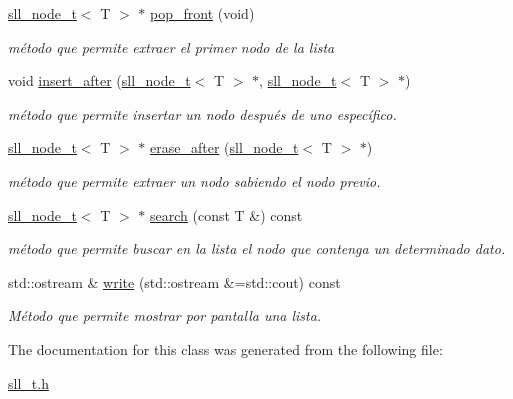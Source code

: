 \begin{DoxyCompactItemize}
\hyperlink{classsll__node__t}{sll\+\_\+node\+\_\+t}$<$ T $>$ $\ast$ \hyperlink{classsll__t_a27c36ba6bbb9b40fec134e6909ff490b}{pop\+\_\+front} (void)
\begin{DoxyCompactList}\small\item\em método que permite extraer el primer nodo de la lista \end{DoxyCompactList}\item 
\mbox{\label{classsll__t_abb114d081db42f36aaba59dc3237847f}} 
void \hyperlink{classsll__t_abb114d081db42f36aaba59dc3237847f}{insert\+\_\+after} (\hyperlink{classsll__node__t}{sll\+\_\+node\+\_\+t}$<$ T $>$ $\ast$, \hyperlink{classsll__node__t}{sll\+\_\+node\+\_\+t}$<$ T $>$ $\ast$)
\begin{DoxyCompactList}\small\item\em método que permite insertar un nodo después de uno específico. \end{DoxyCompactList}\item 
\mbox{\label{classsll__t_ad5b8b92ca0a0a4a1cb8f90ddf208b342}} 
\hyperlink{classsll__node__t}{sll\+\_\+node\+\_\+t}$<$ T $>$ $\ast$ \hyperlink{classsll__t_ad5b8b92ca0a0a4a1cb8f90ddf208b342}{erase\+\_\+after} (\hyperlink{classsll__node__t}{sll\+\_\+node\+\_\+t}$<$ T $>$ $\ast$)
\begin{DoxyCompactList}\small\item\em método que permite extraer un nodo sabiendo el nodo previo. \end{DoxyCompactList}\item 
\mbox{\label{classsll__t_add4e1348fa35c6fb0816208a864f96b3}} 
\hyperlink{classsll__node__t}{sll\+\_\+node\+\_\+t}$<$ T $>$ $\ast$ \hyperlink{classsll__t_add4e1348fa35c6fb0816208a864f96b3}{search} (const T \&) const
\begin{DoxyCompactList}\small\item\em método que permite buscar en la lista el nodo que contenga un determinado dato. \end{DoxyCompactList}\item 
\mbox{\label{classsll__t_ab11e6fe1ed2adc1e7e3c4a15b07dd8ff}} 
std\+::ostream \& \hyperlink{classsll__t_ab11e6fe1ed2adc1e7e3c4a15b07dd8ff}{write} (std\+::ostream \&=std\+::cout) const
\begin{DoxyCompactList}\small\item\em Método que permite mostrar por pantalla una lista. \end{DoxyCompactList}\end{DoxyCompactItemize}


The documentation for this class was generated from the following file\+:\begin{DoxyCompactItemize}
\item 
\hyperlink{sll__t_8h}{sll\+\_\+t.\+h}\end{DoxyCompactItemize}
